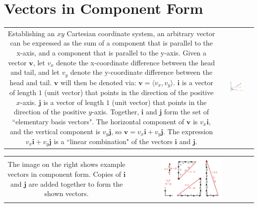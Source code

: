 \documentclass{article}
\begin{document}
\section*{Vectors in Component Form}


\begin{tabular}{cc}
\parbox{0.5\textwidth}{
Establishing an \(xy\) Cartesian coordinate system, an arbitrary vector can be expressed as the sum of a component that is parallel to the x-axis, and a component that is parallel to the y-axis. Given a vector \(\mathbf{v}\), let \(v_x\) denote the x-coordinate difference between the head and tail, and let \(v_y\) denote the y-coordinate difference between the head and tail. \(\mathbf{v}\) will then be denoted via: \(\mathbf{v} = \langle v_x, v_y \rangle\). \(\mathbf{i}\) is a vector of length \(1\) (unit vector) that points in the direction of the positive \(x\)-axis. \(\mathbf{j}\) is a vector of length \(1\) (unit vector) that points in the direction of the positive \(y\)-axis. Together, \(\mathbf{i}\) and \(\mathbf{j}\) form the set of ``elementary basis vectors". The horizontal component of \(\mathbf{v}\) is \(v_x\mathbf{i}\), and the vertical component is \(v_y\mathbf{j}\), so \(\mathbf{v} = v_x\mathbf{i} + v_y\mathbf{j}\). The expression \(v_x\mathbf{i} + v_y\mathbf{j}\) is a ``linear combination" of the vectors \(\mathbf{i}\) and \(\mathbf{j}\).
} & \parbox{0.5\textwidth}{
\includegraphics[width = 0.5\textwidth]{component_form}
}
\end{tabular}

\begin{tabular}{cc}
\parbox{0.5\textwidth}{
The image on the right shows example vectors in component form. Copies of \(\mathbf{i}\) and \(\mathbf{j}\) are added together to form the shown vectors.
} & \parbox{0.5\textwidth}{
\includegraphics[width = 0.5\textwidth]{component_vector_examples}
}
\end{tabular}
\end{document}
